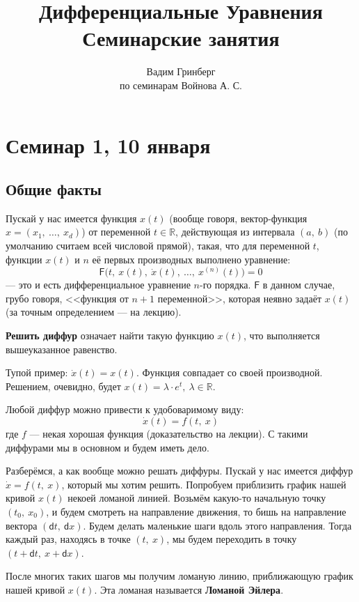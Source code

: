 \documentclass[a4paper,12pt]{article}
\title{\Huge{Дифференциальные Уравнения \\ Семинарские занятия}}
\author{Вадим Гринберг \\ по семинарам Войнова А. С.}
\date{}
\newcommand{\R}{\mathbb{R}}
\renewcommand{\d}{\mathsf{d}}
\newcommand{\dx}{\dot{x}}
\newcommand{\F}{\mathsf{F}}
\begin{document}
\maketitle
\tableofcontents
\newpage

\section{Семинар 1, 10 января}

\subsection{Общие факты}
Пускай у нас имеется функция $x(t)$ (вообще говоря, вектор-функция $x = (x_1,\ \ldots,\ x_d)$) от переменной $t \in \R$, действующая из интервала $(a,\ b)$ (по умолчанию считаем всей числовой прямой), такая, что для переменной $t$, функции $x(t)$ и $n$ её первых производных выполнено уравнение:
\[\F\big(t,\ x(t),\ \dot{x}(t),\ \ldots,\ x^{(n)}(t)\big) = 0\] --- это и есть дифференциальное уравнение $n$-го порядка. $\F$ в данном случае, грубо говоря, <<функция от $n + 1$ переменной>>, которая неявно задаёт $x(t)$ (за точным определением --- на лекцию). 

\textbf{Решить диффур} означает найти такую функцию $x(t)$, что выполняется вышеуказанное равенство.

Тупой пример: $\dx(t) = x(t)$. Функция совпадает со своей производной. Решением, очевидно, будет $x(t) = \lambda \cdot e^t,\ \lambda \in \R$.

Любой диффур можно привести к удобоваримому виду: \[\dx(t) = f(t,\ x)\] где $f$ --- некая хорошая функция (доказательство на лекции). С такими диффурами мы в основном и будем иметь дело.

Разберёмся, а как вообще можно решать диффуры. Пускай у нас имеется диффур $\dx = f(t,\ x)$, который мы хотим решить. Попробуем приблизить график нашей кривой $x(t)$ некоей ломаной линией. Возьмём какую-то начальную точку $(t_0,\ x_0)$, и будем смотреть на направление движения, то бишь на направление вектора $(\d t,\ \d x)$. Будем делать маленькие шаги вдоль этого направления. Тогда каждый раз, находясь в точке $(t,\ x)$, мы будем переходить в точку $(t + \d t,\ x + \d x)$. 

После многих таких шагов мы получим ломаную линию, приближающую график нашей кривой $x(t)$. Эта ломаная называется \textbf{Ломаной Эйлера}.
\end{document}
